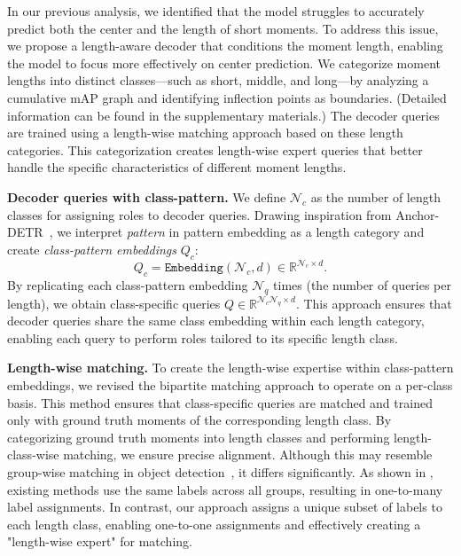 \noindent 

In our previous analysis, we identified that the model struggles to accurately predict both the center and the length of short moments. To address this issue, we propose a length-aware decoder that conditions the moment length, enabling the model to focus more effectively on center prediction. We categorize moment lengths into distinct classes—such as short, middle, and long—by analyzing a cumulative mAP graph and identifying inflection points as boundaries. (Detailed information can be found in the supplementary materials.) The decoder queries are trained using a length-wise matching approach based on these length categories. This categorization creates length-wise expert queries that better handle the specific characteristics of different moment lengths.

\vspace{1mm}
\noindent\textbf{Decoder queries with class-pattern.} We define $\mathcal{N}_c$ as the number of length classes for assigning roles to decoder queries. Drawing inspiration from Anchor-DETR~\cite{wang2109anchor_Anchor_DETR}, we interpret \textit{pattern} in pattern embedding as a length category and create \textit{class-pattern embeddings} \(Q_c\):
\begin{equation}
    Q_c = \texttt{Embedding}(\mathcal{N}_c, d) \in \mathbb{R}^{\mathcal{N}_c \times d}.
\end{equation}
By replicating each class-pattern embedding $\mathcal{N}_q$ times (the number of queries per length), we obtain class-specific queries \(Q \in \mathbb{R}^{\mathcal{N}_c \mathcal{N}_q \times d}\). This approach ensures that decoder queries share the same class embedding within each length category, enabling each query to perform roles tailored to its specific length class.

\vspace{1mm}
\noindent\textbf{Length-wise matching.}
To create the length-wise expertise within class-pattern embeddings, we revised the bipartite matching approach to operate on a per-class basis.
This method ensures that class-specific queries are matched and trained only with ground truth moments of the corresponding length class.
By categorizing ground truth moments into length classes and performing length-class-wise matching, we ensure precise alignment.
Although this may resemble group-wise matching in object detection~\cite{chen2023group_Group_DETR}, it differs significantly. As shown in , existing methods use the same labels across all groups, resulting in one-to-many label assignments.
In contrast, our approach assigns a unique subset of labels to each length class, enabling one-to-one assignments and effectively creating a "length-wise expert" for matching.


